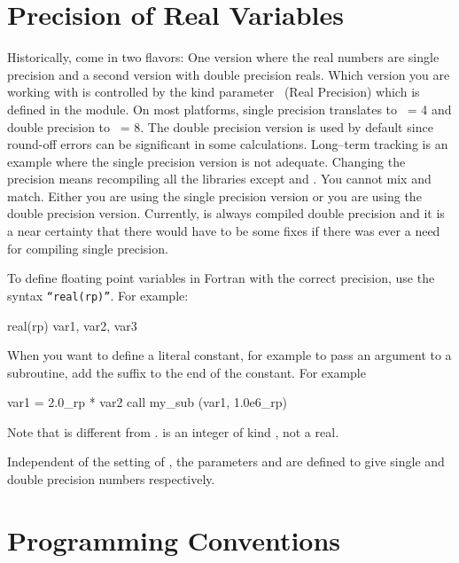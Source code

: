 {{{{{{%
\section{Precision of Real Variables}
\label{s:precision}


Historically, \bmad come in two flavors: One version where the real
numbers are single precision and a second version with double
precision reals. Which version you are working with is controlled by
the kind parameter \ (Real Precision) which is defined in the
 module. On most platforms, single precision
translates to \ = 4 and double precision to \ = 8. The
double precision version is used by default since round-off errors can
be significant in some calculations. Long--term tracking is an example
where the single precision version is not adequate. Changing the
precision means recompiling all the libraries except  and
.  You cannot mix and match. Either you are using the
single precision version or you are using the double precision
version. Currently, \bmad is always compiled double precision and it
is a near certainty that there would have to be some fixes if there
was ever a need for compiling single precision.

To define floating point variables in Fortran with the correct precision,
 use the syntax {\tt ``real(rp)''}. For example:
\begin{example}
    real(rp) var1, var2, var3
\end{example}
When you want to define a literal constant, for example to pass an
argument to a subroutine, add the suffix  to the end of the
constant. For example
\begin{example}
   var1 =  2.0_rp * var2
   call my_sub (var1, 1.0e6_rp)
\end{example}
Note that  is different from .  is an
integer of kind , not a real.

Independent of the setting of , the parameters  and
 are defined to give single and double precision numbers
respectively.

\section{Programming Conventions}
\label{s:prog.conventions}

}}}}}}
